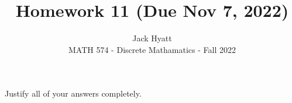 \documentclass[12pt]{article}
\begin{document}
	
	
	
	\title{Homework 11 (Due Nov 7, 2022)}
	\author{Jack Hyatt\\ %
		MATH 574 - Discrete Mathamatics - Fall 2022} 
	
	\maketitle
	
	Justify all of your answers completely.\\
	
	\renewcommand{\qedsymbol}{$\blacksquare$}
	
	\medskip 
\end{document}
